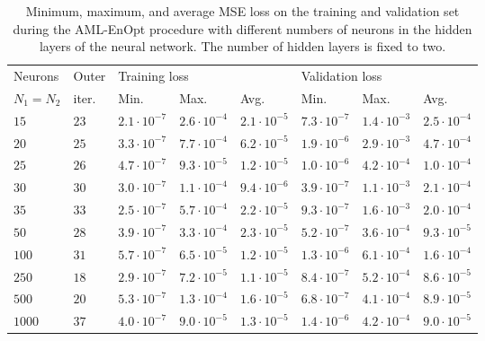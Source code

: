 \begin{table}[h]
\caption{\label{DNNLossComparison}Minimum, maximum, and average MSE loss on the training and validation set during the AML-EnOpt procedure with different numbers of neurons in the hidden layers of the neural network. The number of hidden layers is fixed to two.}
\centering
\begin{tabular}{|l|l|lll|lll|}
\hline
Neurons & Outer  & \multicolumn{3}{l|}{Training loss} & \multicolumn{3}{l|}{Validation loss} \\
\cline{3-5}\cline{6-8}
$N_1=N_2$ & iter. & Min. & Max. & Avg. & Min. & Max. & Avg.\\
\hline
$15$ & $23$ & $2.1\cdot10^{-7}$ & $2.6\cdot10^{-4}$ & $2.1\cdot10^{-5}$ & $7.3\cdot10^{-7}$ & $1.4\cdot10^{-3}$ & $2.5\cdot10^{-4}$\\
$20$ & $25$ & $3.3\cdot10^{-7}$ & $7.7\cdot10^{-4}$ & $6.2\cdot10^{-5}$ & $1.9\cdot10^{-6}$ & $2.9\cdot10^{-3}$ & $4.7\cdot10^{-4}$\\
$25$ & $26$ & $4.7\cdot10^{-7}$ & $9.3\cdot10^{-5}$ & $1.2\cdot10^{-5}$ & $1.0\cdot10^{-6}$ & $4.2\cdot10^{-4}$ & $1.0\cdot10^{-4}$\\
$30$ & $30$ & $3.0\cdot10^{-7}$ & $1.1\cdot10^{-4}$ & $9.4\cdot10^{-6}$ & $3.9\cdot10^{-7}$ & $1.1\cdot10^{-3}$ & $2.1\cdot10^{-4}$\\
$35$ & $33$ & $2.5\cdot10^{-7}$ & $5.7\cdot10^{-4}$ & $2.2\cdot10^{-5}$ & $9.3\cdot10^{-7}$ & $1.6\cdot10^{-3}$ & $2.0\cdot10^{-4}$\\
$50$ & $28$ & $3.9\cdot10^{-7}$ & $3.3\cdot10^{-4}$ & $2.3\cdot10^{-5}$ & $5.2\cdot10^{-7}$ & $3.6\cdot10^{-4}$ & $9.3\cdot10^{-5}$\\
$100$ & $31$ & $5.7\cdot10^{-7}$ & $6.5\cdot10^{-5}$ & $1.2\cdot10^{-5}$ & $1.3\cdot10^{-6}$ & $6.1\cdot10^{-4}$ & $1.6\cdot10^{-4}$\\
$250$ & $18$ & $2.9\cdot10^{-7}$ & $7.2\cdot10^{-5}$ & $1.1\cdot10^{-5}$ & $8.4\cdot10^{-7}$ & $5.2\cdot10^{-4}$ & $8.6\cdot10^{-5}$\\
$500$ & $20$ & $5.3\cdot10^{-7}$ & $1.3\cdot10^{-4}$ & $1.6\cdot10^{-5}$ & $6.8\cdot10^{-7}$ & $4.1\cdot10^{-4}$ & $8.9\cdot10^{-5}$\\
$1000$ & $37$ & $4.0\cdot10^{-7}$ & $9.0\cdot10^{-5}$ & $1.3\cdot10^{-5}$ & $1.4\cdot10^{-6}$ & $4.2\cdot10^{-4}$ & $9.0\cdot10^{-5}$\\
\hline
\end{tabular}
\end{table}

